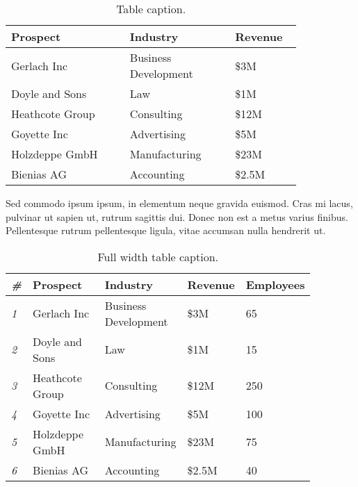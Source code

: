 \documentclass[a4paper]{CSMakotoTechnicalReport}
\begin{document}
\begin{multicols}{2}
    \begin{table}[H] %
        \caption{Table caption.}
        \begin{tabular}{L{0.35\linewidth} L{0.31\linewidth} L{0.17\linewidth}} %
            \toprule
            \textbf{Prospect} & \textbf{Industry} & \textbf{Revenue} \\
            \midrule
            Gerlach Inc & Business Development & \$3M\\
            Doyle and Sons & Law & \$1M\\
            Heathcote Group & Consulting & \$12M\\
            Goyette Inc & Advertising & \$5M\\
            Holzdeppe GmbH & Manufacturing & \$23M\\
            Bienias AG & Accounting & \$2.5M\\
            \bottomrule
        \end{tabular}
        \label{tab:example}
    \end{table}

    Sed commodo ipsum ipsum, in elementum neque gravida euismod. Cras mi lacus, pulvinar ut sapien ut, rutrum sagittis dui. Donec non est a metus varius finibus. Pellentesque rutrum pellentesque ligula, vitae accumsan nulla hendrerit ut.


    \begin{table*} %
        \caption{Full width table caption.}
        \begin{tabular}{C{0.03\linewidth} L{0.25\linewidth} L{0.27\linewidth} L{0.16\linewidth} L{0.16\linewidth}} %
            \toprule
            \textit{\#} & \textbf{Prospect} & \textbf{Industry} & \textbf{Revenue} & \textbf{Employees} \\
            \midrule
            \textit{1} & Gerlach Inc & Business Development & \$3M & 65\\
            \textit{2} & Doyle and Sons & Law & \$1M & 15\\
            \textit{3} & Heathcote Group & Consulting & \$12M & 250\\
            \textit{4} & Goyette Inc & Advertising & \$5M & 100\\
            \textit{5} & Holzdeppe GmbH & Manufacturing & \$23M & 75\\
            \textit{6} & Bienias AG & Accounting & \$2.5M & 40\\
            \bottomrule
        \end{tabular}
    \end{table*}


\end{multicols}
\end{document}
